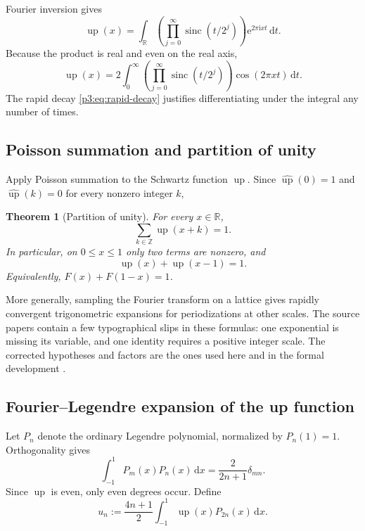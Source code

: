 \documentclass[11pt]{article}
\numberwithin{equation}{section}
\newtheorem{theorem}{Theorem}[section]
\theoremstyle{definition}
\theoremstyle{remark}
\newcommand{\R}{\mathbb R}
\newcommand{\Z}{\mathbb Z}
\newcommand{\upf}{\operatorname{up}}
\newcommand{\sinc}{\operatorname{sinc}}
\newcommand{\dd}{\,\mathrm d}
\newcommand{\e}{\mathrm e}
\newcommand{\ii}{\mathrm i}
\begin{document}
Fourier inversion gives
\begin{equation}\label{p3:eq:up-inversion}
 \upf(x)=\int_{\R}\left(\prod_{j=0}^{\infty}\sinc(t/2^j)\right)
                    \e^{2\pi\ii xt}\dd t.
\end{equation}
Because the product is real and even on the real axis,
\begin{equation}\label{p3:eq:up-cosine-integral}
 \upf(x)=2\int_0^\infty\left(\prod_{j=0}^{\infty}\sinc(t/2^j)\right)
                    \cos(2\pi xt)\dd t.
\end{equation}
The rapid decay \eqref{p3:eq:rapid-decay} justifies differentiating under the integral any number of times.

\subsection{Poisson summation and partition of unity}

Apply Poisson summation to the Schwartz function $\upf$.  Since $\widehat{\upf}(0)=1$ and $\widehat{\upf}(k)=0$ for every nonzero integer $k$,
\begin{theorem}[Partition of unity]\label{p3:thm:partition-unity}
For every $x\in\R$,
\begin{equation}\label{p3:eq:partition-unity}
 \sum_{k\in\Z}\upf(x+k)=1.
\end{equation}
In particular, on $0\le x\le1$ only two terms are nonzero, and
\begin{equation}\label{p3:eq:two-term-partition}
 \upf(x)+\upf(x-1)=1.
\end{equation}
Equivalently, $F(x)+F(1-x)=1$.
\end{theorem}

More generally, sampling the Fourier transform on a lattice gives rapidly convergent trigonometric expansions for periodizations at other scales.  The source papers contain a few typographical slips in these formulas: one exponential is missing its variable, and one identity requires a positive integer scale.  The corrected hypotheses and factors are the ones used here and in the formal development \cite{p3:ProveIt}.

\subsection{Fourier--Legendre expansion of the up function}

Let $P_n$ denote the ordinary Legendre polynomial, normalized by $P_n(1)=1$.  Orthogonality gives
\begin{equation}\label{p3:eq:Legendre-orthogonality}
 \int_{-1}^{1}P_m(x)P_n(x)\dd x=\frac{2}{2n+1}\delta_{mn}.
\end{equation}
Since $\upf$ is even, only even degrees occur.  Define
\begin{equation}\label{p3:eq:Legendre-coeff-def}
 u_n:=\frac{4n+1}{2}\int_{-1}^{1}\upf(x)P_{2n}(x)\dd x.
\end{equation}
\end{document}
